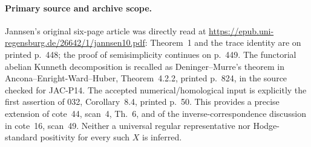 \paragraph{Primary source and archive scope.}
Jannsen's original six-page article was directly read at
\url{https://epub.uni-regensburg.de/26642/1/jannsen10.pdf}:
Theorem~1 and the trace identity are on printed p.~448;
the proof of semisimplicity continues on p.~449.
The functorial abelian Kunneth decomposition is recalled as
Deninger--Murre's theorem in Ancona--Enright-Ward--Huber,
Theorem~4.2.2, printed p.~824, in the source checked for JAC-P14.
The accepted numerical/homological input is explicitly the first
assertion of 032, Corollary~8.4, printed p.~50.
This provides a precise extension of cote~44, scan~4, Th.~6,
and of the inverse-correspondence discussion in cote~16,
scan~49. Neither a universal regular representative nor
Hodge-standard positivity for every such $X$ is inferred.
